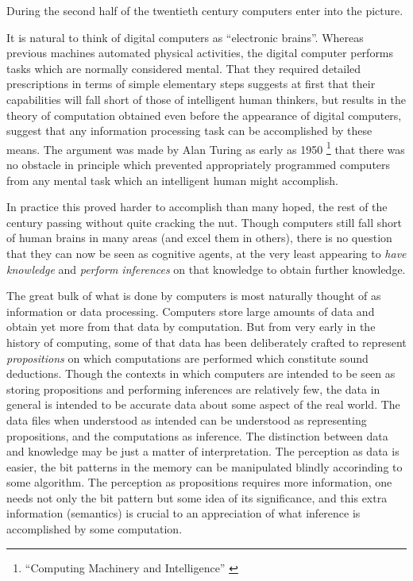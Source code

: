 During the second half of the twentieth century computers enter into the picture.

It is natural to think of digital computers as ``electronic brains''.
Whereas previous machines automated physical activities, the digital computer performs tasks which are normally considered mental.
That they required detailed prescriptions in terms of simple elementary steps suggests at first that their capabilities will fall short of those of intelligent human thinkers, but results in the theory of computation obtained even before the appearance of digital computers, suggest that any information processing task can be accomplished by these means.
The argument was made by Alan Turing as early as 1950%
\footnote{``Computing Machinery and Intelligence'' \cite{turingCMI}}
 that there was no obstacle in principle which prevented appropriately programmed computers from any mental task which an intelligent human might accomplish.

In practice this proved harder to accomplish than many hoped, the rest of the century passing without quite cracking the nut.
Though computers still fall short of human brains in many areas (and excel them in others), there is no question that they can now be seen as cognitive agents, at the very least appearing to \emph{have knowledge} and \emph{perform inferences} on that knowledge to obtain further knowledge.

The great bulk of what is done by computers is most naturally thought of as information or data processing.
Computers store large amounts of data and obtain yet more from that data by computation.
But from very early in the history of computing, some of that data has been deliberately crafted to represent \emph{propositions} on which computations are performed which constitute sound deductions.
Though the contexts in which computers are intended to be seen as storing propositions and performing inferences are relatively few, the data in general is intended to be accurate data about some aspect of the real world.
The data files when understood as intended can be understood as representing propositions, and the computations as inference.
The distinction between data and knowledge may be just a matter of interpretation.
The perception as data is easier, the bit patterns in the memory can be manipulated blindly accorinding to some algorithm.
The perception as propositions requires more information, one needs not only the bit pattern but some idea of its significance, and this extra information (semantics) is crucial to an appreciation of what inference is accomplished by some computation.





